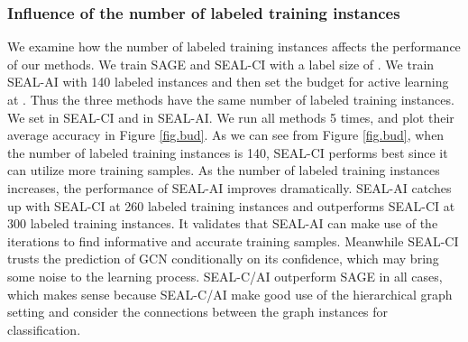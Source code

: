 \documentclass[sigconf]{acmart}
\newcommand{\eat}[1]{}
\begin{document}
\begin{table}
  \caption{Comparison of different methods on the synthetic data set for semi-supervised graph classification}
  \label{tab:synr}
\eat{\vspace{-0.4cm}}
\end{table}

\subsubsection{Influence of the number of labeled training instances}
We examine how the number of labeled training instances affects the performance of our methods.  We train SAGE and SEAL-CI with a label size of .  We train SEAL-AI with 140 labeled instances and then set the budget  for active learning at .  Thus the three methods have the same number of labeled training instances.  We set  in SEAL-CI and  in SEAL-AI.  We run all methods 5 times, and plot their average accuracy in Figure \ref{fig.bud}.  As we can see from Figure \ref{fig.bud}, when the number of labeled training instances is 140, SEAL-CI performs best since it can utilize more training samples.  As the number of labeled training instances increases, the performance of SEAL-AI improves dramatically.  SEAL-AI catches up with SEAL-CI at 260 labeled training instances and outperforms SEAL-CI at 300 labeled training instances.  It validates that SEAL-AI can make use of the iterations to find informative and accurate training samples.  Meanwhile SEAL-CI trusts the prediction of GCN conditionally on its confidence, which may bring some noise to the learning process.  SEAL-C/AI outperform SAGE in all cases, which makes sense because SEAL-C/AI make good use of the hierarchical graph setting and consider the connections between the graph instances for classification.
\end{document}
